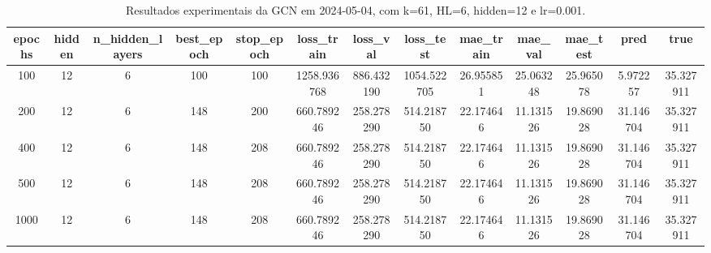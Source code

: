 \begin{table}[h]
\centering
\caption{Resultados experimentais da GCN em 2024-05-04, com k=61, HL=6, hidden=12 e lr=0.001.}
\label{tab:gcn_results_k61_hl6_h12_d20240504}
\begin{tabular}{ccccccccccccc}
\toprule
epochs & hidden & n\_hidden\_layers & best\_epoch & stop\_epoch & loss\_train & loss\_val & loss\_test & mae\_train & mae\_val & mae\_test & pred & true \\
\midrule
100 & 12 & 6 & 100 & 100 & 1258.936768 & 886.432190 & 1054.522705 & 26.955851 & 25.063248 & 25.965078 & 5.972257 & 35.327911 \\
200 & 12 & 6 & 148 & 200 & 660.789246 & 258.278290 & 514.218750 & 22.174646 & 11.131526 & 19.869028 & 31.146704 & 35.327911 \\
400 & 12 & 6 & 148 & 208 & 660.789246 & 258.278290 & 514.218750 & 22.174646 & 11.131526 & 19.869028 & 31.146704 & 35.327911 \\
500 & 12 & 6 & 148 & 208 & 660.789246 & 258.278290 & 514.218750 & 22.174646 & 11.131526 & 19.869028 & 31.146704 & 35.327911 \\
1000 & 12 & 6 & 148 & 208 & 660.789246 & 258.278290 & 514.218750 & 22.174646 & 11.131526 & 19.869028 & 31.146704 & 35.327911 \\
\bottomrule
\end{tabular}
\end{table}
